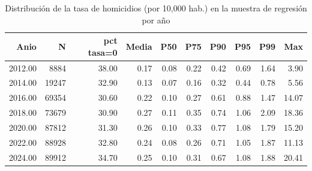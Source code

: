 \begin{table}[ht]
\centering
\caption{Distribuci\'on de la tasa de homicidios (por 10{,}000 hab.) en la muestra de regresi\'on por a\~{n}o} 
\label{tab:11_tasa_hom_distribucion}
\begin{tabular}{rrrrrrrrrr}
  \toprule
Anio & N & pct tasa=0 & Media & P50 & P75 & P90 & P95 & P99 & Max \\ 
  \midrule
2012.00 & 8884 & 38.00 & 0.17 & 0.08 & 0.22 & 0.42 & 0.69 & 1.64 & 3.90 \\ 
  2014.00 & 19247 & 32.90 & 0.13 & 0.07 & 0.16 & 0.32 & 0.44 & 0.78 & 5.56 \\ 
  2016.00 & 69354 & 30.60 & 0.22 & 0.10 & 0.27 & 0.61 & 0.88 & 1.47 & 14.07 \\ 
  2018.00 & 73679 & 30.90 & 0.27 & 0.11 & 0.35 & 0.74 & 1.06 & 2.09 & 18.36 \\ 
  2020.00 & 87812 & 31.30 & 0.26 & 0.10 & 0.33 & 0.77 & 1.08 & 1.79 & 15.20 \\ 
  2022.00 & 88928 & 32.80 & 0.24 & 0.08 & 0.26 & 0.71 & 1.05 & 1.87 & 11.13 \\ 
  2024.00 & 89912 & 34.70 & 0.25 & 0.10 & 0.31 & 0.67 & 1.08 & 1.88 & 20.41 \\ 
   \bottomrule
\end{tabular}
\end{table}

